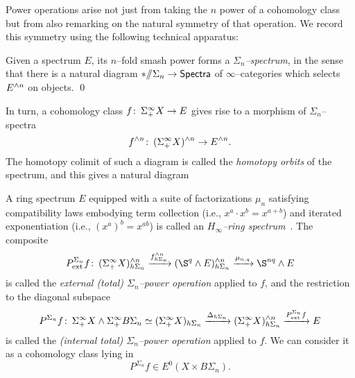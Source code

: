 Power operations arise not just from taking the $n${\th} power of a cohomology class but from also remarking on the natural symmetry of that operation.  We record this symmetry using the following technical apparatus:
\begin{lemma}
Given a spectrum $E$, its $n$--fold smash power forms a \textit{$\Sigma_n$--spectrum}, in the sense that there is a natural diagram $* /\!\!/ \Sigma_n \to \mathsf{Spectra}$ of $\infty$--categories which selects $E^{\wedge n}$ on objects. \qed
\end{lemma}

\noindent In turn, a cohomology class $f\colon\thinspace \Sigma^\infty_+ X \to E$ gives rise to a morphism of $\Sigma_n$--spectra \[f^{\wedge n}\colon\thinspace (\Sigma^\infty_+ X)^{\wedge n} \to E^{\wedge n}.\]  The homotopy colimit of such a diagram is called the \textit{homotopy orbits} of the spectrum, and this gives a natural diagram
\begin{center}
\end{center}
A ring spectrum $E$ equipped with a suite of factorizations $\mu_n$ satisfying compatibility laws embodying term collection (i.e., $x^a \cdot x^b = x^{a+b}$) and iterated exponentiation (i.e., $(x^a)^b = x^{ab}$) is called an \textit{$H_\infty$--ring spectrum}~\cite[Definition I.3.1]{BMMS}.  The composite \[P^{\Sigma_n}_{\mathrm{ext}}f\co (\Susp^\infty_+ X)^{\sm n}_{h\Sigma_n} \xrightarrow{f^{\sm n}_{h\Sigma_n}} (\S^q \sm E)^{\sm n}_{h\Sigma_n} \xrightarrow{\mu_{n,q}} \S^{nq} \sm E\] is called the \textit{external (total) $\Sigma_n$--power operation} applied to $f$, and the restriction to the diagonal subspace \[P^{\Sigma_n}f \colon\thinspace \Sigma^\infty_+ X \wedge \Sigma^\infty_+ B\Sigma_n \simeq (\Sigma^\infty_+ X)_{h\Sigma_n} \xrightarrow{\Delta_{h\Sigma_n}} (\Sigma^\infty_+ X)^{\wedge n}_{h\Sigma_n} \xrightarrow{P^{\Sigma_n}_{\mathrm{ext}}f} E\] is called the \textit{(internal total) $\Sigma_n$--power operation} applied to $f$.  We can consider it as a cohomology class lying in \[P^{\Sigma_n} f \in E^0(X \times B\Sigma_n).\]

